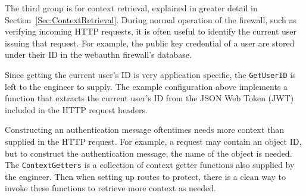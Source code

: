 
The third group is for context retrieval, explained in greater detail in Section~\ref{Sec:ContextRetrieval}. During normal operation of the firewall, such as verifying incoming HTTP requests, it is often useful to identify the current user issuing that request. For example, the public key credential of a user are stored under their ID in the webauthn firewall's database. 

Since getting the current user's ID is very application specific, the \lstinline{GetUserID} is left to the engineer to supply. The example configuration above implements a function that extracts the current user's ID from the JSON Web Token (JWT) included in the HTTP request headers.

Constructing an authentication message oftentimes needs more context than supplied in the HTTP request. For example, a request may contain an object ID, but to construct the authentication message, the name of the object is needed. The \lstinline{ContextGetters} is a collection of context getter functions also supplied by the engineer. Then when setting up routes to protect, there is a clean way to invoke these functions to retrieve more context as needed.






